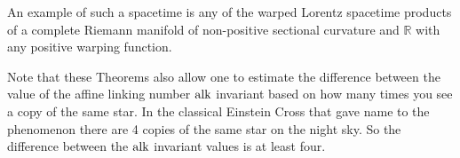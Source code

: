 \documentclass[12pt,reqno,a4paper]{amsart}
\begin{document}
        \begin{rem}
            An example of such a spacetime is any of the warped Lorentz
            spacetime products of a complete Riemann manifold of non-positive
            sectional curvature and $\mathbb{R}$ with any positive warping function.
        \end{rem}
        \begin{rem}
            Note that these Theorems also allow one to estimate the
            difference between the value of the affine linking number $\mathop{\mathrm{alk}}\nolimits$
            invariant based on how many times you see a copy of the same star.
            In the classical Einstein Cross that gave name to the phenomenon
            there are 4 copies of the same star on the night sky. So the
            difference between the $\mathop{\mathrm{alk}}\nolimits$ invariant values is at least four.
        \end{rem}
\end{document}
